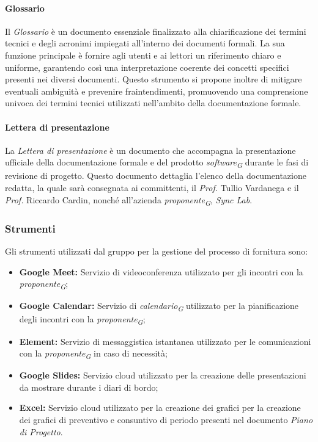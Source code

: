 \paragraph{Glossario}
Il \textit{Glossario} è un documento essenziale finalizzato alla chiarificazione dei termini tecnici e degli acronimi impiegati all'interno dei documenti formali. La sua funzione principale è fornire agli utenti e ai lettori un riferimento chiaro e uniforme, garantendo così una interpretazione coerente dei concetti specifici presenti nei diversi documenti. Questo strumento si propone inoltre di mitigare eventuali ambiguità e prevenire fraintendimenti, promuovendo una comprensione univoca dei termini tecnici utilizzati nell'ambito della documentazione formale. 

\paragraph{Lettera di presentazione}
La \textit{Lettera di presentazione} è un documento che accompagna la presentazione ufficiale della documentazione formale e del prodotto \textit{software}\textsubscript{\textit{G}} durante le fasi di revisione di progetto. Questo documento dettaglia l'elenco della documentazione redatta, la quale sarà consegnata ai committenti, il \textit{Prof.} Tullio Vardanega e il \textit{Prof.} Riccardo Cardin, nonché all'azienda \textit{proponente}\textsubscript{\textit{G}}, \textit{Sync Lab}.  

\subsubsection{Strumenti}
Gli strumenti utilizzati dal gruppo per la gestione del processo di fornitura sono: 
\begin{itemize}
    \item \textbf{Google Meet:}
    Servizio di videoconferenza utilizzato per gli incontri con la \textit{proponente}\textsubscript{\textit{G}}; 
    \item  \textbf{Google Calendar:}
    Servizio di \textit{calendario}\textsubscript{\textit{G}} utilizzato per la pianificazione degli incontri con la \textit{proponente}\textsubscript{\textit{G}}; 
    \item 
    \textbf{Element:}
    Servizio di messaggistica istantanea utilizzato per le comunicazioni con la \textit{proponente}\textsubscript{\textit{G}} in caso di necessità; 
    \item 
    \textbf{Google Slides:}
    Servizio cloud utilizzato per la creazione delle presentazioni da mostrare durante i diari di bordo; 
    \item  \textbf{Excel:} Servizio cloud utilizzato per la creazione dei grafici per la creazione dei grafici di preventivo e consuntivo di periodo presenti nel documento \textit{Piano di Progetto}. 
\end{itemize}

